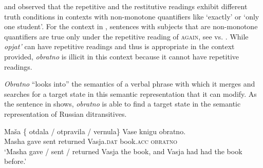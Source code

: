\documentclass[output=paper]{langscibook}
\begin{document}
\noindent \citet{Alexiadou-etal2014} and \citet{Lechner-etal2015} observed that the repetitive and the restitutive readings exhibit different truth conditions in contexts with non-monotone quantifiers like ‘exactly' or `only one student’. For the context in , sentences with subjects that are non-monotone quantifiers are true only under the repetitive reading of \textsc{again}, see  vs. . While \textit{opjat’} can have repetitive readings and thus  is appropriate in the context provided, \textit{obratno} is illicit in this context because it cannot have repetitive readings.



\textit{Obratno} “looks into” the semantics of a verbal phrase with which it merges and searches for a target state in this semantic representation that it can modify. As the sentence in  shows, \textit{obratno} is able to find a target state in the semantic representation of Russian ditransitives.


 \ea\label{ex:bondarenko:20}
\gll Maša \{\hspace{-2pt} otdala / otpravila / vernula\} Vase knigu obratno.\\
     Masha {} gave {} sent {} returned Vasja.\textsc{dat} book.\textsc{acc} \textsc{obratno}\\
\glt `Masha gave / sent / returned Vasja the book, and Vasja had had the book before.'
\z
\end{document}
